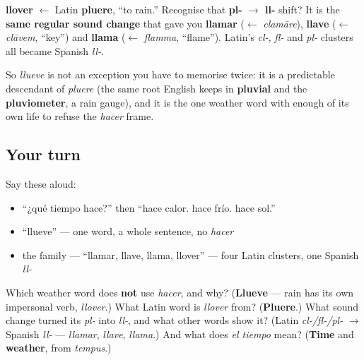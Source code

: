 \begin{cousinweb}
\textbf{llover} $\leftarrow$ Latin \textbf{pluere}, \textquotedblleft{}to rain.\textquotedblright{} Recognise that \textbf{pl- $\to$ ll-} shift? It is the \textbf{same regular sound change} that gave you \textbf{llamar} ($\leftarrow$ \emph{clamāre}), \textbf{llave} ($\leftarrow$ \emph{clāvem}, \textquotedblleft{}key\textquotedblright{}) and \textbf{llama} ($\leftarrow$ \emph{flamma}, \textquotedblleft{}flame\textquotedblright{}). Latin's \emph{cl-}, \emph{fl-} and \emph{pl-} clusters all became Spanish \emph{ll-}.

So \emph{llueve} is not an exception you have to memorise twice: it is a predictable descendant of \emph{pluere} (the same root English keeps in \textbf{pluvial} and the \textbf{pluviometer}, a rain gauge), and it is the one weather word with enough of its own life to refuse the \emph{hacer} frame.
\end{cousinweb}

\subsection*{Your turn}
Say these aloud:

\begin{itemize}
\raggedright
  \item \textquotedblleft{}¿qué tiempo hace?\textquotedblright{} then \textquotedblleft{}hace calor. hace frío. hace sol.\textquotedblright{}
  \item \textquotedblleft{}llueve\textquotedblright{} — one word, a whole sentence, no \emph{hacer}
  \item the family — \textquotedblleft{}llamar, llave, llama, llover\textquotedblright{} — four Latin clusters, one Spanish \emph{ll-}
\end{itemize}

\begin{tcolorbox}[breakable,colback=teal!4,colframe=teal!35!black,title={Before you move on}]
Which weather word does \textbf{not} use \emph{hacer}, and why? (\textbf{Llueve} — rain has its own impersonal verb, \emph{llover}.) What Latin word is \emph{llover} from? (\textbf{Pluere}.) What sound change turned its \emph{pl-} into \emph{ll-}, and what other words show it? (Latin \emph{cl-/fl-/pl-} $\to$ Spanish \emph{ll-} — \emph{llamar}, \emph{llave}, \emph{llama}.) And what does \emph{el tiempo} mean? (\textbf{Time} and \textbf{weather}, from \emph{tempus}.)
\end{tcolorbox}
